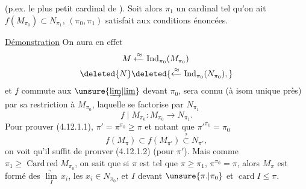 (p.ex. le plus petit cardinal 
de ). Soit alors $\pi_1$ un cardinal tel
qu'on ait $f(M_{\pi_0})\subset N_{\pi_1}$, 
 
 $(\pi_0,\pi_1)$ satisfait aux conditions énoncées.

\uline{Démonstration} \hspace{1em} On aura en effet
\[
\begin{aligned}
 M&\xleftarrow{\approx}\mathrm{Ind}_{\pi_0}(M_{\pi_0})\\
 \deleted{N}&\deleted{\xleftarrow{\approx}\mathrm{Ind}_{\pi_0}(N_{\pi_0}),}
\end{aligned}
\]
et $f$ commute aux $\unsure{\underrightarrow{\lim}|\underline{\lim}}$  devant
$\pi_0$, sera connu (à isom unique
près) par sa restriction à $M_{\pi_0}$, laquelle
se factorise par $N_{\pi_1}$
\[
 f\mid M_{\pi_0}: M_{\pi_0}\longrightarrow N_{\pi_1}.
\]
Pour prouver (4.12.1.1),  $\pi'=\pi^{\pi_0}\geq\pi$
et notant que ${\pi'}^{\pi_0}=\pi_0$
\[
 f(M_\pi)\subset f(M_{\pi'})\overset{?}{\subset}N_{\pi'},
\]
on voit qu'il suffit de prouver
(4.12.1.2) (pour $\pi'$).  Mais comme
$\pi_1\geq\operatorname{Card\,red}M_{\pi_0}$, on sait que si $\pi$ est
tel que $\pi\geq\pi_1$, $\pi^{\pi_0}=\pi$, alors $M_\pi$
est formé des $\underset I{\underrightarrow{\lim}}\,x_i$, les $x_i\in N_{\pi_0}$,
et $I$  devant $\unsure{\pi.|\pi_0}$ et $\operatorname{card} I\leq\pi$.
